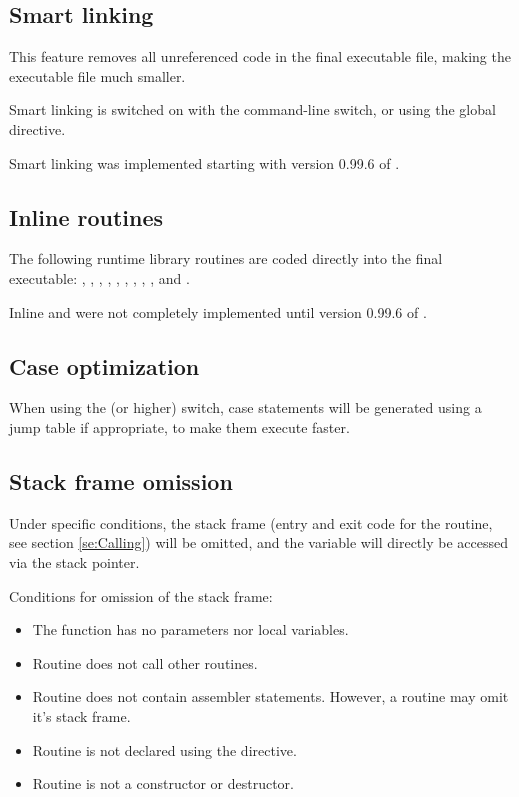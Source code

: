\subsection{Smart linking}

This feature removes all unreferenced code in the final executable
file, making the executable file much smaller.

Smart linking is switched on with the  command-line switch, or
using the  global directive.

\begin{remark}Smart linking was implemented starting with version 0.99.6 of \fpc.
\end{remark}

\subsection{Inline routines}

The following runtime library routines are coded directly into the
final executable: , , , ,
, , , , ,
 and .

\begin{remark}Inline  and  were not completely
implemented until version 0.99.6 of \fpc.
\end{remark}

\subsection{Case optimization}

When using the  (or higher) switch, case statements will be
generated using a jump table if appropriate, to make them execute
faster.

\subsection{Stack frame omission}

Under specific conditions, the stack frame (entry and exit code for
the routine, see section \ref{se:Calling}) will be omitted, and the
variable will directly be accessed via the stack pointer.

Conditions for omission of the stack frame:

\begin{itemize}
\item The function has no parameters nor local variables.
\item Routine does not call other routines.
\item Routine does not contain assembler statements. However,
a  routine may omit it's stack frame.
\item Routine is not declared using the  directive.
\item Routine is not a constructor or destructor.
\end{itemize}

